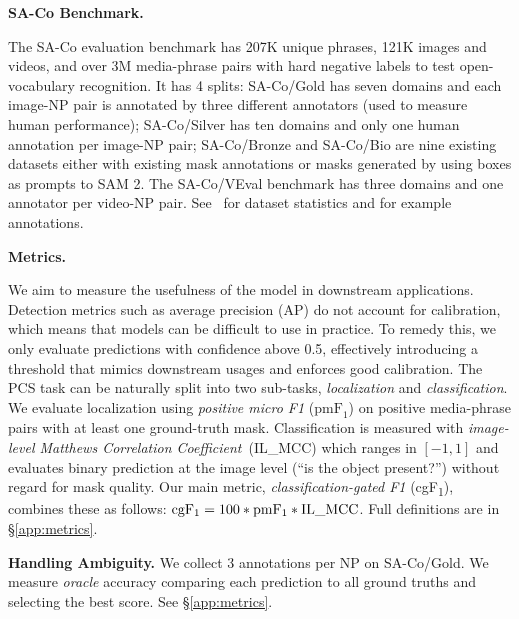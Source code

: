 \documentclass[]{fairmeta}
\newcommand{\task}{PCS\xspace}
\newcommand{\dsname}{{SA-Co}\xspace}
\newcommand{\evalgold}{{\dsname/Gold}\xspace}
\newcommand{\evalsilv}{{\dsname/Silver}\xspace}
\newcommand{\evalext}{{\dsname/Bronze}\xspace}
\newcommand{\evalbio}{{\dsname/Bio}\xspace}
\newcommand{\evalvid}{{\dsname/VEval}\xspace}
\newcommand{\imgplusvideotestvocab}{207K\xspace}
\newcommand{\imgplusvideotestmedia}{121K\xspace}
\newcommand{\imgplusvideotestnps}{3M\xspace}
\newcommand{\cgf}{cgF\textsubscript{1}\xspace}
\newcommand{\pmf}{pmF\textsubscript{1}\xspace}
\newcommand{\ilmcc}{IL\_MCC\xspace}
\renewcommand{\paragraph}[1]{%
	\noindent\textbf{#1.}\noindent\xspace%
}
\begin{document}
\paragraph{\dsname Benchmark}
The \dsname evaluation benchmark has \imgplusvideotestvocab unique phrases, \imgplusvideotestmedia images and videos, and over \imgplusvideotestnps media-phrase pairs with hard negative labels to test open-vocabulary recognition.
It has 4 splits: \evalgold has seven domains and each image-NP pair is annotated by three different annotators (used to measure human performance); \evalsilv has ten domains and only one human annotation per image-NP pair; \evalext and \evalbio are nine existing datasets either with existing mask annotations or masks generated by using boxes as prompts to SAM 2. 
The \evalvid benchmark has three domains and one annotator per video-NP pair. See~ for dataset statistics and  for example annotations.


\paragraph{Metrics}
We aim to measure the usefulness of the model in downstream applications. Detection metrics such as average precision (AP) do not account for calibration, which means that models can be difficult to use in practice. To remedy this, we only evaluate predictions with confidence above 0.5, effectively introducing a threshold that mimics downstream usages and enforces good calibration. The \task task can be naturally split into two sub-tasks, \emph{localization} and \emph{classification}. We evaluate localization using \emph{positive micro F1} ($\mathrm{pmF}_1$) on positive media-phrase pairs with at least one ground-truth mask. Classification is measured with \emph{image-level Matthews Correlation Coefficient}~(\ilmcc) which ranges in $[-1,1]$ and evaluates binary prediction at the image level (``is the object present?'') without regard for mask quality. Our main metric, \emph{classification-gated F1} (\cgf), combines these as follows:
$\mathrm{\cgf} = 100*\mathrm{\pmf} * \mathrm{\ilmcc}$. Full definitions are in \S\ref{app:metrics}.


\paragraph{Handling Ambiguity} %
We collect 3 annotations per NP on \evalgold. We measure \emph{oracle} accuracy comparing each prediction to all ground truths and selecting the best score. See \S\ref{app:metrics}.
\end{document}
